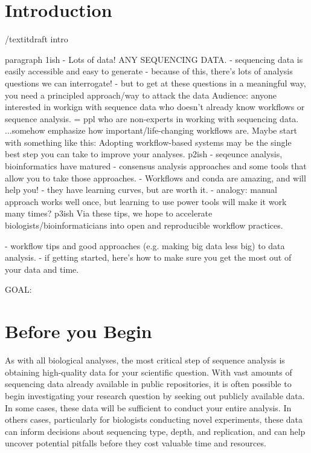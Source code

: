 \documentclass[10pt,letterpaper]{article}
\begin{document}
\linenumbers

\section*{Introduction}

/textit{draft intro}

paragraph 1ish
- Lots of data! ANY SEQUENCING DATA.
- sequencing data is easily accessible and easy to generate
- because of this, there's lots of analysis questions we can interrogate!
- but to get at these questions in a meaningful way, you need a principled approach/way to attack the data
Audience: anyone interested in workign with sequence data who doesn't already know workflows or sequence analysis. 
 = ppl who are non-experts in working with sequencing data.
...somehow emphasize how important/life-changing workflows are. Maybe start with something like this: Adopting workflow-based systems may be the single best step you can take to improve your analyses. %
p2ish
- seqeunce analysis, bioinformatics have matured - consensus analysis approaches and some tools that allow you to take those approaches.
- Workflows and conda are amazing, and will help you!
- they have learning curves, but are worth it.
- analogy: manual approach works well once, but learning to use power tools will make it work many times?
p3ish
Via these tips, we hope to accelerate biologists/bioinformaticians into open and reproducible workflow practices.

- workflow tips and good approaches (e.g. making big data less big) to data analysis.
- if getting started, here's how to make sure you get the most out of your data and time.

GOAL: 


\section*{Before you Begin}

As with all biological analyses, the most critical step of sequence analysis is obtaining high-quality data for your scientific question. 
With vast amounts of sequencing data already available in public repositories, it is often possible to begin investigating your research question by seeking out publicly available data. 
In some cases, these data will be sufficient to conduct your entire analysis. 
In others cases, particularly for biologists conducting novel experiments, these data can inform decisions about sequencing type, depth, and replication, and can help uncover potential pitfalls before they cost valuable time and resources.
\end{document}
